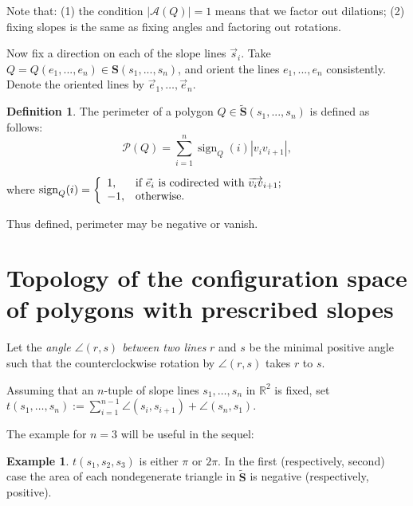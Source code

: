 \documentclass[12pt]{amsart}
\theoremstyle{plain}
\theoremstyle{definition}
\newtheorem{definition}{Definition}
\newtheorem{example}{Example}
\theoremstyle{remark}
\theoremstyle{plain}
\theoremstyle{definition}
\def\R{\mathbb{R}}
\DeclareMathOperator\sign{sign}
\newcommand{\defeq}{:=}
\begin{document}
Note that: (1) the condition $|\mathcal{A}(Q)|=1$ means that we  factor out dilations; (2) fixing slopes is the same as fixing angles and factoring out rotations.
\bigskip


Now fix a direction on each of the slope lines $\vec{s}_i$. Take $Q=Q(e_1,...,e_n)\in \mathbf{S}(s_1,...,s_n)$, and orient the lines $e_1,...,e_n$ consistently. Denote the oriented lines by $\vec{e}_1,\ldots,\vec{e}_n$.

\begin{definition}\label{DefPerim}
  The  perimeter of a polygon $Q\in \widetilde{\mathbf{S}}(s_1,...,s_n)$  is defined as follows:
\[
\mathcal{P}(Q)=\sum_{i=1}^n \sign_Q(i)|v_iv_{i+1}|,
\]

where \(\sign_Q(i)=\left\{
                                                   \begin{array}{ll}
                                                     1, & \hbox{if $\vec{e}_i$ is codirected with $\overrightarrow{v_iv}_{i+1}$;} \\
                                                     -1, & \hbox{otherwise.}
                                                   \end{array}
                                                 \right.\)

\end{definition}

Thus defined, perimeter may be negative or vanish.

\section{Topology of the configuration space  of polygons with prescribed slopes}



Let the \textit{angle \(\angle(r,s)\) between two lines} $r$ and $s$ be the minimal positive angle such that the counterclockwise rotation by \(\angle(r,s)\) takes \(r\) to \(s\).

Assuming that an $n$-tuple of slope lines  \(s_1,\ldots,s_n\) in \(\R^2\) is fixed, set
\newline \(t(s_1,\ldots,s_n)\defeq\sum_{i=1}^{n-1}\angle(s_i,s_{i+1})+\angle(s_n,s_1)\).

\medskip

The example for \(n=3\) will be useful in the sequel:
\begin{example}\label{triangle}
\(t(s_1,s_2,s_3)\) is either \(\pi\) or \(2\pi\). In the first (respectively, second) case the area of each nondegenerate triangle in \(\widetilde{\mathbf{S}}\) is negative (respectively, positive).

\end{example}
\end{document}
